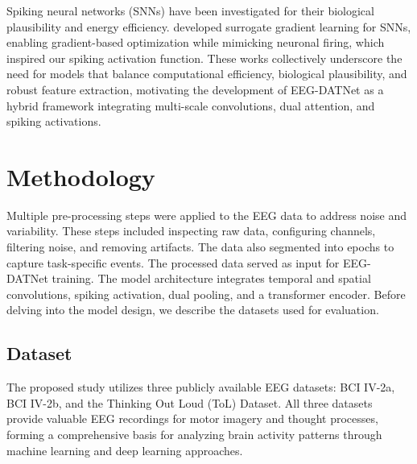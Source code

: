 \documentclass[pdflatex,sn-mathphys-num]{sn-jnl}%
\theoremstyle{thmstyleone}%
\theoremstyle{thmstyletwo}%
\theoremstyle{thmstylethree}%
\begin{document}
Spiking neural networks (SNNs) have been investigated for their biological plausibility and energy efficiency. \citet{neftci2019surrogate} developed surrogate gradient learning for SNNs, enabling gradient-based optimization while mimicking neuronal firing, which inspired our spiking activation function. These works collectively underscore the need for models that balance computational efficiency, biological plausibility, and robust feature extraction, motivating the development of EEG-DATNet as a hybrid framework integrating multi-scale convolutions, dual attention, and spiking activations.


\section{Methodology}\label{subsec1}
Multiple pre-processing steps were applied to the EEG data to address noise and variability. These steps included inspecting raw data, configuring channels, filtering noise, and removing artifacts. The data  also segmented into epochs to capture task-specific events. The processed data served as input for EEG-DATNet training. The model architecture integrates temporal and spatial convolutions, spiking activation, dual pooling, and a transformer encoder. Before delving into the model design, we describe the datasets used for evaluation.

\subsection{Dataset}
The proposed study utilizes three publicly available EEG datasets: BCI IV-2a, BCI IV-2b, and the Thinking Out Loud (ToL) Dataset. All three datasets provide valuable EEG recordings for motor imagery and thought processes, forming a comprehensive basis for analyzing brain activity patterns through machine learning and deep learning approaches.
\end{document}

